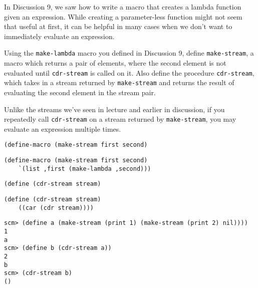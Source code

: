 \question In Discussion 9, we saw how to write a macro
that creates a lambda function given an expression. While creating 
a parameter-less function might not seem that useful at first,
it can be helpful in many cases when we don't want to immediately
evaluate an expression.

Using the \texttt{make-lambda} macro you defined in Discussion 9, define
\texttt{make-stream}, a macro which returns a pair of elements, where
the second element is not evaluated until \texttt{cdr-stream} is called
on it. Also define the procedure \texttt{cdr-stream}, which takes in a
stream returned by \texttt{make-stream} and returns the result of evaluating
the second element in the stream pair. 

Unlike the streams we've seen in lecture and earlier in discussion, if you repeatedly 
call \texttt{cdr-stream} on a stream returned by \texttt{make-stream}, you may evaluate
an expression multiple times.

\begin{lstlisting}
(define-macro (make-stream first second)
\end{lstlisting}

\begin{solution}[.7in]
\begin{lstlisting}
(define-macro (make-stream first second)
	`(list ,first (make-lambda ,second)))
\end{lstlisting}
\end{solution}

\begin{lstlisting}
(define (cdr-stream stream)
\end{lstlisting}

\begin{solution}[.7in]
\begin{lstlisting}
(define (cdr-stream stream)
	((car (cdr stream))))
\end{lstlisting}
\end{solution}
\begin{lstlisting}
scm> (define a (make-stream (print 1) (make-stream (print 2) nil))))
1
a
scm> (define b (cdr-stream a))
2
b
scm> (cdr-stream b)
()
\end{lstlisting}
